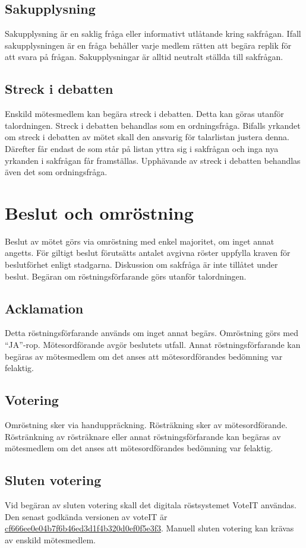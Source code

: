 \documentclass[11pt, includeaddress]{classes/cthit}
\begin{document}
\subsection{Sakupplysning}
Sakupplysning är en saklig fråga eller informativt utlåtande kring sakfrågan. Ifall sakupplysningen är en fråga behåller varje medlem rätten att begära replik för att svara på frågan.
Sakupplysningar är alltid neutralt ställda till sakfrågan.
\subsection{Streck i debatten}
Enskild mötesmedlem kan begära streck i debatten.
Detta kan göras utanför talordningen.
Streck i debatten behandlas som en ordningsfråga. Bifalls yrkandet om streck i debatten av mötet skall den ansvarig för talarlistan justera denna.
Därefter får endast de som står på listan yttra sig i sakfrågan och inga nya yrkanden i sakfrågan får framställas.
Upphävande av streck i debatten behandlas även det som ordningsfråga.
\section{Beslut och omröstning}
Beslut av mötet görs via omröstning med enkel majoritet, om inget annat angetts. För giltigt beslut förutsätts antalet avgivna röster uppfylla kraven för beslutförhet enligt stadgarna. Diskussion om sakfråga är inte tillåtet under beslut. Begäran om röstningsförfarande görs utanför talordningen.
\subsection{Acklamation}
Detta röstningsförfarande används om inget annat begärs. Omröstning görs med ``JA''-rop. Mötesordförande avgör beslutets utfall. Annat röstningsförfarande kan begäras av mötesmedlem om det anses att mötesordförandes bedömning var felaktig.
\subsection{Votering}
Omröstning sker via handuppräckning. Rösträkning sker av mötesordförande. Röstränkning av rösträknare eller annat röstningsförfarande kan begäras av mötesmedlem om det anses att mötesordförandes bedömning var felaktig.
\subsection{Sluten votering}
Vid begäran av sluten votering skall det digitala röstsystemet VoteIT användas.
Den senast godkända versionen av voteIT är
\href{https://github.com/cthit/VoteIT/commit/cf666ee0e04b7f6b46ed3d1f4b320d0ef0f5e3f3}{cf666ee0e04b7f6b46ed3d1f4b320d0ef0f5e3f3}.
Manuell sluten votering kan krävas av enskild mötesmedlem.
\end{document}
